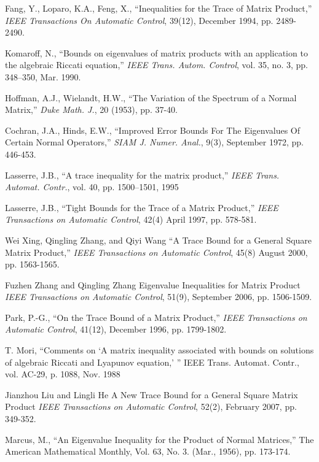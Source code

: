 \documentclass{svmult}
\begin{document}
\begin{thebibliography}{99}
Fang, Y., Loparo, K.A., Feng, X.,
``Inequalities for the Trace of Matrix Product,''
{\it IEEE Transactions On Automatic Control}, 39(12), December 1994,
pp. 2489-2490.

Komaroff, N., ``Bounds on eigenvalues of matrix products with an application
to the algebraic Riccati equation,'' {\it IEEE Trans. Autom. Control},
vol. 35, no. 3, pp. 348–350, Mar. 1990.

Hoffman, A.J., Wielandt, H.W., 
``The Variation of the Spectrum of a Normal Matrix,''
{\it Duke Math. J.}, 20 (1953), pp. 37-40.

Cochran, J.A., Hinds, E.W.,
``Improved Error Bounds For The
Eigenvalues Of Certain Normal Operators,''
{\it SIAM J. Numer. Anal.}, 9(3), September 1972,
pp. 446-453.

Lasserre, J.B., ``A trace inequality for the matrix product,'' {\it IEEE Trans.
Automat. Contr.}, vol. 40, pp. 1500–1501, 1995

Lasserre, J.B., ``Tight Bounds for the Trace of a Matrix Product,''
{\it IEEE Transactions on Automatic Control}, 42(4) April 1997,
pp. 578-581.

Wei Xing, Qingling Zhang, and Qiyi Wang
``A Trace Bound for a General Square Matrix Product,''
{\it IEEE Transactions on Automatic Control}, 45(8) August 2000,
pp. 1563-1565.

Fuzhen Zhang and Qingling Zhang
Eigenvalue Inequalities for Matrix Product
{\it IEEE Transactions on Automatic Control}, 51(9), September 2006,
pp. 1506-1509.

Park, P.-G.,
``On the Trace Bound of a Matrix Product,''
{\it IEEE Transactions on Automatic Control}, 41(12), December 1996,
pp. 1799-1802.

T. Mori, “Comments on ‘A matrix inequality associated with bounds on
solutions of algebraic Riccati and Lyapunov equation,’ ” IEEE Trans.
Automat. Contr., vol. AC-29, p. 1088, Nov. 1988

Jianzhou Liu and Lingli He
A New Trace Bound for a General Square Matrix Product
{\it IEEE Transactions on Automatic Control}, 52(2), February 2007,
pp. 349-352.

Marcus, M.,
``An Eigenvalue Inequality for the Product of Normal Matrices,''
The American Mathematical Monthly, Vol. 63, No. 3. (Mar., 1956), pp. 173-174.


\end{thebibliography}
\end{document}

